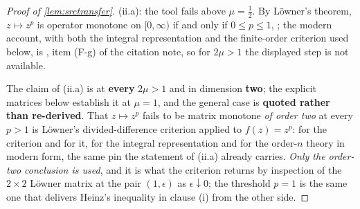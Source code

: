 \begin{proof}[Proof of \cref{lem:srctransfer}]
(ii.a): the tool fails above $\mu=\tfrac12$. By L\"owner's theorem, $z\mapsto z^{p}$ is operator
monotone on $[0,\infty)$ if and only if $0\le p\le1$, \citet{loewner1934}; the modern account, with
both the integral representation and the finite-order criterion used below, is
\citet[Ch.~V]{bhatia1997}, item (F-g) of the citation note, so for $2\mu>1$ the displayed step is not
available.

The claim of (ii.a) is at \textbf{every} $2\mu>1$ and in dimension \textbf{two}; the explicit
matrices below establish it at $\mu=1$, and the general case is \textbf{quoted rather than re-derived}.
That $z\mapsto z^{p}$ fails to be matrix monotone \emph{of order two} at every $p>1$ is L\"owner's
divided-difference criterion applied to $f(z)=z^{p}$: \citet{loewner1934} for the criterion and
\citet[Ch.~V]{bhatia1997} for it, for the integral representation and for the order-$n$ theory in modern
form, the same pin the statement of (ii.a) already carries. \emph{Only the order-two
conclusion is used}, and it is what the criterion returns by inspection of the $2\times2$ L\"owner matrix
at the pair $(1,\epsilon)$ as $\epsilon\downarrow0$; the threshold $p=1$ is the same one that delivers
Heinz's inequality in clause (i) from the other side.


\end{proof}
